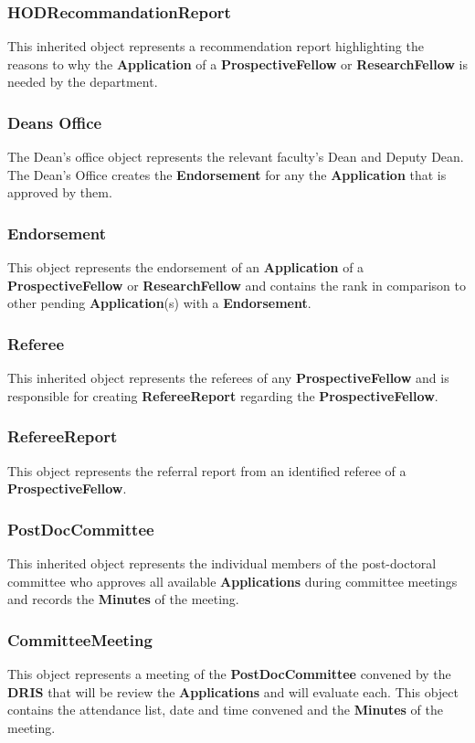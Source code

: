 \documentclass[12pt]{article}
\begin{document}
\subsubsection{HODRecommandationReport}
This inherited object represents a recommendation report highlighting the reasons to why the \textbf{Application} of a \textbf{ProspectiveFellow} or \textbf{ResearchFellow} is needed by the department.

\subsubsection{Deans Office}
The Dean's office object represents the relevant faculty's Dean and Deputy Dean. The Dean's Office creates the \textbf{Endorsement} for any the \textbf{Application} that is approved by them.

\subsubsection{Endorsement}
This object represents the endorsement of an \textbf{Application} of a \textbf{ProspectiveFellow} or \textbf{ResearchFellow} and contains the rank in comparison to other pending \textbf{Application}(s) with a \textbf{Endorsement}.

\subsubsection{Referee}
This inherited object represents the referees of any \textbf{ProspectiveFellow} and is responsible for creating \textbf{RefereeReport} regarding the \textbf{ProspectiveFellow}.

\subsubsection{RefereeReport}
This object represents the referral report from an identified referee of a \textbf{ProspectiveFellow}.

\subsubsection{PostDocCommittee}
This inherited object represents the individual members of the post-doctoral committee who approves all available \textbf{Applications} during committee meetings and records the \textbf{Minutes} of the meeting.

\subsubsection{CommitteeMeeting}
This object represents a meeting of the \textbf{PostDocCommittee} convened by the \textbf{DRIS} that will be review the \textbf{Applications} and will evaluate each. This object contains the attendance list, date and time convened and the \textbf{Minutes} of the meeting.
\end{document}
